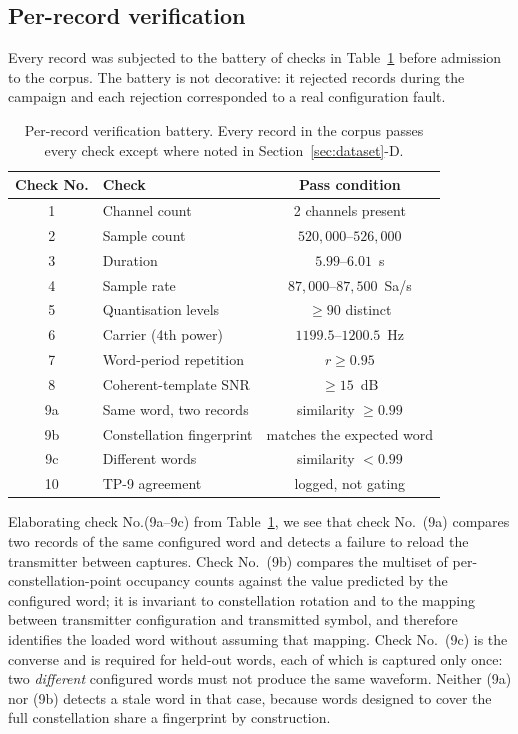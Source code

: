 \documentclass[journal]{IEEEtran}   %
\begin{document}
\subsection{Per-record verification}
Every record was subjected to the battery of checks in Table~\ref{tab:checks}
before admission to the corpus. The battery is not decorative: it rejected
records during the campaign and each rejection corresponded to a real
configuration fault.

\begin{table}[!t]
\caption{Per-record verification battery. Every record in the corpus passes
every check except where noted in Section~\ref{sec:dataset}-D.}
\label{tab:checks}
\centering
\small
\begin{tabular}{clc}
\toprule
Check No. & Check & Pass condition \\
\midrule
1  & Channel count            & 2 channels present \\
2  & Sample count             & $520{,}000$--$526{,}000$ \\
3  & Duration                 & $5.99$--$6.01$~s \\
4  & Sample rate              & $87{,}000$--$87{,}500$~Sa/s \\
5  & Quantisation levels      & $\geq 90$ distinct \\
6  & Carrier (4th power)      & $1199.5$--$1200.5$~Hz \\
7  & Word-period repetition   & $r \geq 0.95$ \\
8  & Coherent-template SNR    & $\geq 15$~dB \\
9a & Same word, two records   & similarity $\geq 0.99$ \\
9b & Constellation fingerprint & matches the expected word \\
9c & Different words          & similarity $< 0.99$ \\
10 & TP-9 agreement           & logged, not gating \\
\bottomrule
\end{tabular}
\end{table}

Elaborating check No.(9a--9c) from Table~\ref{tab:checks}, we see that check No.~(9a) compares two records of the same
configured word and detects a failure to reload the transmitter between
captures. Check No.~(9b) compares the multiset of per-constellation-point occupancy
counts against the value predicted by the configured word; it is invariant to
constellation rotation and to the mapping between transmitter configuration and
transmitted symbol, and therefore identifies the loaded word without assuming
that mapping. Check No.~(9c) is the converse and is required for held-out words, each
of which is captured only once: two \emph{different} configured words must not
produce the same waveform. Neither (9a) nor (9b) detects a stale word in that case,
because words designed to cover the full constellation share a fingerprint by
construction.
\end{document}
